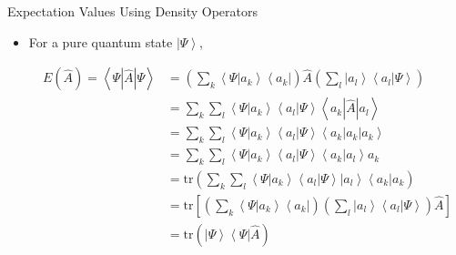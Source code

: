 \documentclass[9pt,handout]{beamer}
\newcommand{\tr}[0]{\text{tr}}
\begin{document}
\begin{frame}{Expectation Values Using Density Operators}
\begin{itemize}
\item For a pure quantum state $\left\lvert \Psi \right\rangle$,

\begin{align*}
E \left( \widehat{A} \right) = \left\langle \Psi \left\lvert \widehat{A} \right\rvert \Psi \right\rangle & = \left( \sum_k \left\langle \Psi \right. \left\lvert a_k \right\rangle \left\langle a_k \right\rvert \right) \widehat{A} \left( \sum_l \left\lvert a_l \right\rangle \left\langle a_l \right\rvert \left. \Psi \right\rangle \right) \\
& = \sum_k \sum_l \left\langle \Psi \right. \left\lvert a_k \right\rangle \left\langle a_l \right. \left\lvert \Psi \right\rangle \left\langle a_k \left\lvert \widehat{A} \right\rvert a_l \right\rangle \\
& = \sum_k \sum_l \left\langle \Psi \right. \left\lvert a_k \right\rangle \left\langle a_l \right. \left\lvert \Psi \right\rangle \left\langle a_k \left\lvert a_k \right\rvert a_k \right\rangle \\
& = \sum_k \sum_l \left\langle \Psi \right. \left\lvert a_k \right\rangle \left\langle a_l \right. \left\lvert \Psi \right\rangle \left\langle a_k \right\rvert \left. a_l \right\rangle a_k \\
& = \tr \left( \sum_k \sum_l \left\langle \Psi \right. \left\lvert a_k \right\rangle \left\langle a_l \right. \left\lvert \Psi \right\rangle \left\lvert a_l \right\rangle \left\langle a_k \right\rvert a_k \right) \\
& = \tr \left[ \left( \sum_k \left\langle \Psi \right. \left\lvert a_k \right\rangle \left\langle a_k \right\rvert \right) \left( \sum_l \left\lvert a_l \right\rangle \left\langle a_l \right\rvert \left. \Psi \right\rangle \right) \widehat{A} \right] \\
& = \tr \left( \left\lvert \Psi \right\rangle \left\langle \Psi \right\rvert \widehat{A} \right)
\end{align*}
\end{itemize}
\end{frame}
\end{document}
